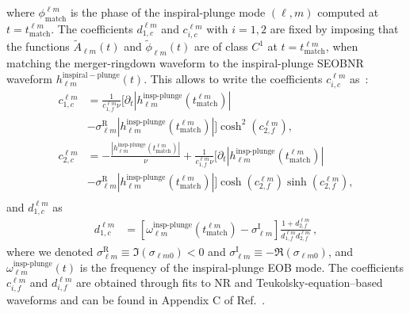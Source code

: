 \documentclass[twocolumn,prd,superscriptaddress,amsfonts,amssymb,amsmath,preprintnumbers]{revtex4-1}
\begin{document}
%
where $ \phi_{\textrm{match}}^{\ell m}$ is the phase of the inspiral-plunge mode $(\ell, m)$ computed at $t = t_{\textrm{match}}^{\ell m}$. The coefficients $d_{1,c}^{\ell m}$ and $c_{i,c}^{\ell m}$ with $i = 1,2$
are fixed by imposing that the functions $\tilde{A}_{\ell m}(t)$ and $\tilde{\phi}_{\ell m}(t)$ are of class $C^1$ at $t = t_{\textrm{match}}^{\ell m}$, when matching the merger-ringdown waveform to the inspiral-plunge SEOBNR waveform $h_{\ell m}^\mathrm{inspiral-plunge}(t)$. This allows to write the coefficients $c_{i,c}^{\ell m}$ as~\cite{Cotesta:2018fcv}:
\begin{align} 
c_{1,c}^{\ell m} &= \frac{1}{c_{1,f}^{\ell
    m} \nu} \big[ \partial_t|h_{\ell
    m}^{\textrm{insp-plunge}}(t_{\textrm{match}}^{\ell m})| \nonumber \\
    &- \sigma^\textrm{R}_{\ell m} |h_{\ell
    m}^{\textrm{insp-plunge}}(t_{\textrm{match}}^{\ell
    m})|\big] \cosh^2{(c_{2,f}^{\ell m})}, \\
c_{2,c}^{\ell m} &= -\frac{ |h_{\ell
    m}^{\textrm{insp-plunge}}(t_{\textrm{match}}^{\ell
    m})|}{\nu} + \frac{1}{c_{1,f}^{\ell
    m} \nu} \big[ \partial_t|h_{\ell
    m}^{\textrm{insp-plunge}}(t_{\textrm{match}}^{\ell m})|  \nonumber \\
    &- \sigma^\textrm{R}_{\ell m} |h_{\ell
    m}^{\textrm{insp-plunge}}(t_{\textrm{match}}^{\ell
    m})|\big] \cosh{(c_{2,f}^{\ell m})}\sinh{(c_{2,f}^{\ell m})}, \\ \nonumber   
\end{align}
and $d_{1,c}^{\ell m}$ as
\begin{align}    
d_{1,c}^{\ell m} &= \left[\omega_{\ell m}^{\textrm{insp-plunge}}(t_{\textrm{match}}^{\ell m}) -  \sigma^\textrm{I}_{\ell
      m}\right]\frac{1+ d_{2,f}^{\ell m}}{d_{1,f}^{\ell m}d_{2,f}^{\ell m}}\,,
\end{align}
%
where we denoted $\sigma_{\ell m}^\textrm{R} \equiv \Im (\sigma_{\ell m0}) < 0$ and  $\sigma_{\ell m}^\textrm{I} \equiv -\Re (\sigma_{\ell m0})$, and $\omega_{\ell m}^{\textrm{insp-plunge}}(t)$ is the frequency of the inspiral-plunge EOB mode. The coefficients $c_{i,f}^{\ell m}$ and $d_{i,f}^{\ell m}$ are obtained through fits to NR and 
Teukolsky-equation--based waveforms and can be found in Appendix C of Ref.~\cite{Cotesta:2018fcv}.
\end{document}
